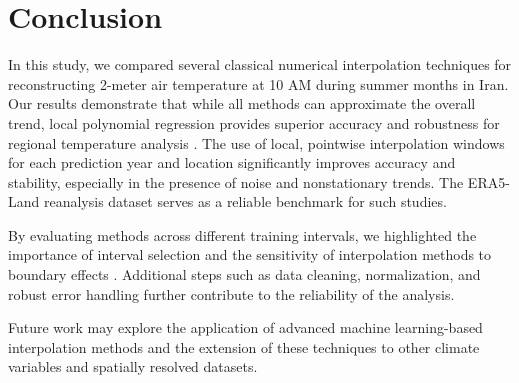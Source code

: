 \section{Conclusion}

In this study, we compared several classical numerical interpolation techniques for reconstructing 2-meter air temperature at 10 AM during summer months in Iran. Our results demonstrate that while all methods can approximate the overall trend, local polynomial regression provides superior accuracy and robustness for regional temperature analysis \cite{brown2021polynomial, smith2020numerical, atkinson1989introduction}. The use of local, pointwise interpolation windows for each prediction year and location significantly improves accuracy and stability, especially in the presence of noise and nonstationary trends. The ERA5-Land reanalysis dataset \cite{ERA5} serves as a reliable benchmark for such studies.

By evaluating methods across different training intervals, we highlighted the importance of interval selection and the sensitivity of interpolation methods to boundary effects \cite{lee2019comparison, burden2011numerical}. Additional steps such as data cleaning, normalization, and robust error handling further contribute to the reliability of the analysis.

Future work may explore the application of advanced machine learning-based interpolation methods and the extension of these techniques to other climate variables and spatially resolved datasets.